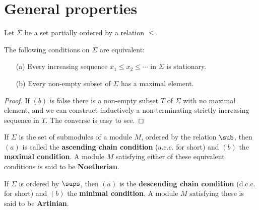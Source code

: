 \section{General properties}
Let $\Sigma$ be a set partially ordered by a relation $\leq$.
\begin{proposition}\label{chain condition}
The following conditions on $\Sigma$ are equivalent:
\begin{itemize}
\item[(a)] Every increasing sequence $x_1\leq x_2\leq\cdots$ in $\Sigma$ is stationary.
\item[(b)] Every non-empty subset of $\Sigma$ has a maximal element.
\end{itemize}
\end{proposition}
\begin{proof}
If $(b)$ is false there is a non-empty subset $T$ of $\Sigma$ with no maximal element, and we can construct inductively a non-terminating strictly increasing sequence in $T$. The converse is easy to see.
\end{proof}
If $\Sigma$ is the set of submodules of a module $M$, ordered by the relation $\sub$, then $(a)$ is called the \textbf{ascending chain condition} (a.c.c. for short) and $(b)$ the \textbf{maximal condition}. A module $M$ satisfying either of these equivalent conditions is said to be \textbf{Noetherian}.\par 
If $\Sigma$ is ordered by $\sups$, then $(a)$ is the \textbf{descending chain condition} (d.c.c. for short) and $(b)$ the \textbf{minimal condition}. A module $M$ satisfying these is said to be \textbf{Artinian}.
